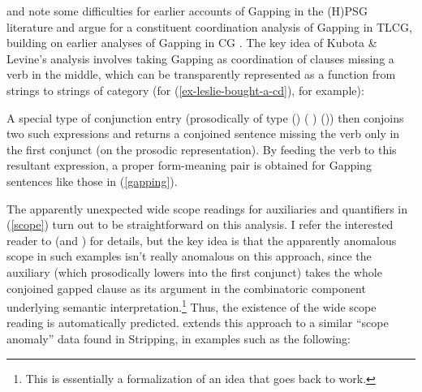\documentclass[output=paper,biblatex,babelshorthands,newtxmath,draftmode,colorlinks,citecolor=brown]{langscibook}
\begin{document}
\largerpage
\citet{kubota-levine-gapping} and 
\citet[Section~3.1]{KubotaLevineBook} note some
difficulties for earlier accounts of Gapping in the (H)PSG literature
\citep{sgww,abeille-ea} and argue for a constituent coordination
analysis of Gapping in TLCG, building on earlier analyses of Gapping
in CG \citep{Steedman90a-u,hendriks95,morrillsolias93}. The key idea
of Kubota \& Levine's analysis involves taking Gapping as coordination of clauses
missing a verb in the middle, which can be transparently represented
as a function from strings to strings of category {} (for (\ref{ex-leslie-bought-a-cd}), for example):

\begin{exe}
 \ex
  \LexEnt{\pt{\ensuremath{\lambda} \ensuremath{\greekp}. leslie \ensuremath{\circ}\xspace \ensuremath{\greekp} \ensuremath{\circ}\xspace a \ensuremath{\circ}\xspace cd }}{\sem{ \lambda R. \exists x. \trns{cd}(x) \ensuremath{ \wedge\xspace } R(x)(\trns{l}) }}{\syncat{S\vs ((NP\ensuremath{\backslash}{}S)/NP)}}
\end{exe}
A special type of conjunction entry (prosodically of type
(\yusukest\xspace \shortarrow \yusukest\xspace) \shortarrow (\yusukest\xspace
\shortarrow \yusukest\xspace) \shortarrow (\yusukest\xspace \shortarrow \yusukest\xspace))
then conjoins two such expressions
and returns a conjoined sentence missing the verb only in the first
conjunct (on the prosodic representation). By feeding the verb to
this resultant expression,  a proper form-meaning  pair is obtained
for Gapping sentences like those in (\ref{gapping}).

The apparently unexpected wide scope readings for auxiliaries and
quantifiers in (\ref{scope}) turn out to be straightforward on this
analysis. I refer the interested reader to
\citet{kubota-levine-gapping} (and \citet[Chapter~3]{KubotaLevineBook}) for
details, but the key idea is that the apparently anomalous scope in
such examples isn't really anomalous on this approach, since the
auxiliary (which prosodically lowers into the first conjunct) takes
the whole conjoined gapped clause as its argument in the combinatoric
component underlying semantic interpretation.\footnote{This is
  essentially a formalization of an idea that goes back to
   work.} Thus, the existence
of the wide scope reading is automatically predicted.
\citet{puthawala2018} extends this approach to a similar ``scope anomaly''
data found in Stripping, in examples such as the following:
\end{document}
